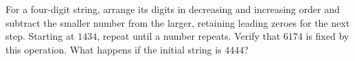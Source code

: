 For a four-digit string, arrange its digits in decreasing and increasing order and subtract the smaller number from the larger, retaining leading zeroes for the next step. Starting at $1434$, repeat until a number repeats. Verify that $6174$ is fixed by this operation. What happens if the initial string is $4444$?
